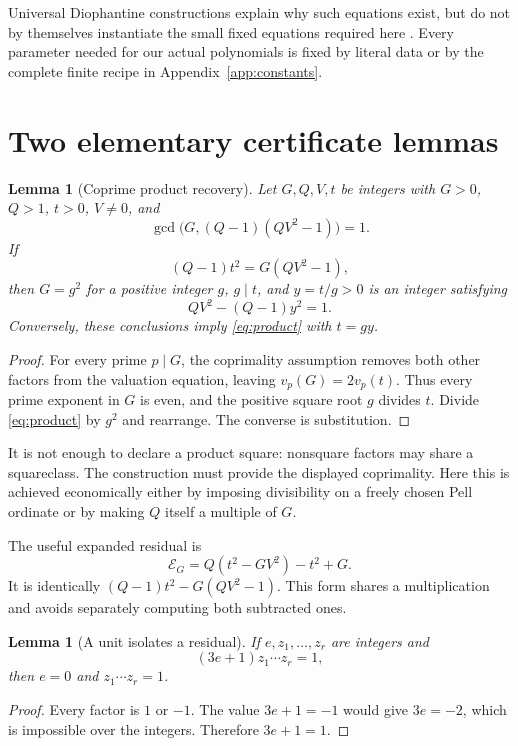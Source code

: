 \documentclass[11pt,letterpaper]{article}
\newtheorem{lemma}[theorem]{Lemma}
\theoremstyle{remark}\newtheorem{remark}[theorem]{Remark}
\begin{document}
Universal Diophantine constructions explain why such equations exist, but do
not by themselves instantiate the small fixed equations required here
\cite{jones,bayer}. Every parameter needed for our actual polynomials is fixed
by literal data or by the complete finite recipe in Appendix~\ref{app:constants}.

\section{Two elementary certificate lemmas}
\label{sec:lemmas}

\begin{lemma}[Coprime product recovery]\label{lem:product}
Let $G,Q,V,t$ be integers with $G>0$, $Q>1$, $t>0$, $V\ne0$, and
\[
\gcd\bigl(G,(Q-1)(QV^2-1)\bigr)=1.
\]
If
\begin{equation}\label{eq:product}
(Q-1)t^2=G(QV^2-1),
\end{equation}
then $G=g^2$ for a positive integer $g$, $g\mid t$, and $y=t/g>0$ is an
integer satisfying
\[
QV^2-(Q-1)y^2=1.
\]
Conversely, these conclusions imply \eqref{eq:product} with $t=gy$.
\end{lemma}
\begin{proof}
For every prime $p\mid G$, the coprimality assumption removes both other
factors from the valuation equation, leaving $v_p(G)=2v_p(t)$. Thus every
prime exponent in $G$ is even, and the positive square root $g$ divides $t$.
Divide \eqref{eq:product} by $g^2$ and rearrange. The converse is substitution.
\end{proof}

It is not enough to declare a product square: nonsquare factors may share a
squareclass. The construction must provide the displayed coprimality. Here
this is achieved economically either by imposing divisibility on a freely
chosen Pell ordinate or by making $Q$ itself a multiple of $G$.

The useful expanded residual is
\begin{equation}\label{eq:folded}
\mathcal E_G=Q(t^2-GV^2)-t^2+G.
\end{equation}
It is identically $(Q-1)t^2-G(QV^2-1)$. This form shares a multiplication
and avoids separately computing both subtracted ones.

\begin{lemma}[A unit isolates a residual]\label{lem:unit}
If $e,z_1,\ldots,z_r$ are integers and
\[
(3e+1)z_1\cdots z_r=1,
\]
then $e=0$ and $z_1\cdots z_r=1$.
\end{lemma}
\begin{proof}
Every factor is $1$ or $-1$. The value $3e+1=-1$ would give $3e=-2$, which
is impossible over the integers. Therefore $3e+1=1$.
\end{proof}
\end{document}
